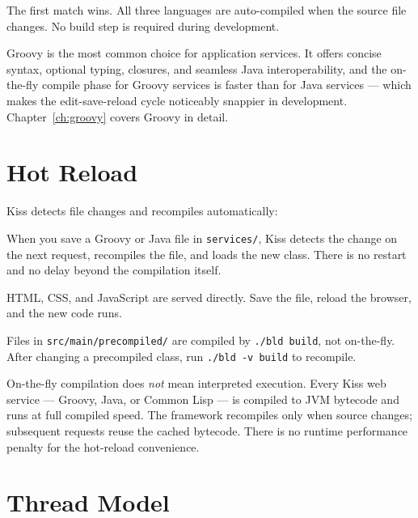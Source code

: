 \noindent
The first match wins.  All three languages are auto-compiled when the source file changes.  No build step is required during development.

\begin{notebox}
Groovy is the most common choice for application services.  It offers concise syntax, optional typing, closures, and seamless Java interoperability, and the on-the-fly compile phase for Groovy services is faster than for Java services --- which makes the edit-save-reload cycle noticeably snappier in development.  Chapter~\ref{ch:groovy} covers Groovy in detail.
\end{notebox}

\section{Hot Reload}
\label{sec:arch-hotreload}

Kiss detects file changes and recompiles automatically:

\begin{description}[style=nextline]
  \item[Backend services] When you save a Groovy or Java file in \texttt{services/}, Kiss detects the change on the next request, recompiles the file, and loads the new class.  There is no restart and no delay beyond the compilation itself.
  \item[Frontend files] HTML, CSS, and JavaScript are served directly.  Save the file, reload the browser, and the new code runs.
  \item[Precompiled classes] Files in \texttt{src/main/precompiled/} are compiled by \texttt{./bld build}, not on-the-fly.  After changing a precompiled class, run \texttt{./bld -v build} to recompile.
\end{description}

\begin{notebox}
On-the-fly compilation does \emph{not} mean interpreted execution.  Every Kiss web service --- Groovy, Java, or Common Lisp --- is compiled to JVM bytecode and runs at full compiled speed.  The framework recompiles only when source changes; subsequent requests reuse the cached bytecode.  There is no runtime performance penalty for the hot-reload convenience.
\end{notebox}

\section{Thread Model}
\label{sec:arch-threads}

